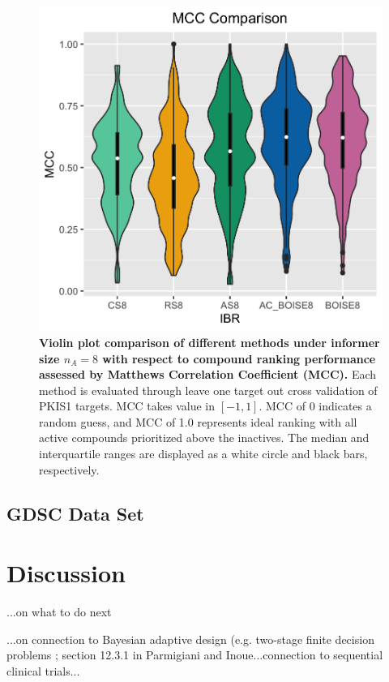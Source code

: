 \documentclass[12pt]{article}
\begin{document}
\begin{figure}[!ht]
\caption{\label{fig:auc2} 
{\bf Violin plot comparison of different methods under informer size $n_A =8$ with respect to compound ranking performance assessed by Matthews Correlation Coefficient (MCC).} Each method is evaluated through leave one target out cross validation of PKIS1 targets. MCC takes value in $[-1,1]$. MCC of $0$ indicates a random guess, and MCC of 1.0 represents ideal ranking with all active compounds prioritized above the inactives. The median and interquartile ranges are displayed as a white circle and black bars, respectively.} 
\centering
\includegraphics[width=5.0in]{pkis1_8_MCC.png}
\end{figure}

\subsection{GDSC Data Set}

\section{Discussion}

...on what to do next

...on connection to Bayesian adaptive design (e.g.
two-stage finite decision problems ; section 12.3.1 in 
Parmigiani and Inoue...connection to sequential clinical trials...

%
%
\end{document}
